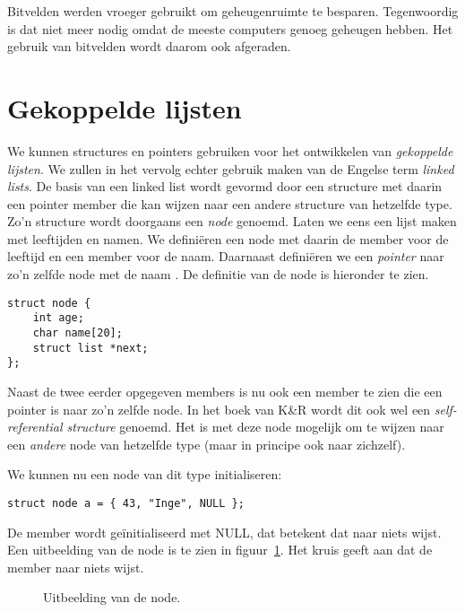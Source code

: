 Bitvelden werden vroeger gebruikt om geheugenruimte te besparen. Tegenwoordig is dat niet meer nodig omdat de meeste computers genoeg geheugen hebben. Het gebruik van bitvelden wordt daarom ook afgeraden.


\section{Gekoppelde lijsten}
We kunnen structures en pointers gebruiken voor het ontwikkelen van \textsl{gekoppelde lijsten}. We zullen in het vervolg echter gebruik maken van de Engelse term \textsl{linked lists}. De basis van een linked list wordt gevormd door een structure met daarin een pointer member die kan wijzen naar een andere structure van hetzelfde type. Zo'n structure wordt doorgaans een \textsl{node} genoemd. Laten we eens een lijst maken met leeftijden en namen. We definiëren een node met daarin de member  voor de leeftijd en een member  voor de naam. Daarnaast definiëren we een \textsl{pointer} naar zo'n zelfde node met de naam . De definitie van de node is hieronder te zien.

\begin{lstlisting}[style=lstoneline]
struct node {
	int age;
	char name[20];
	struct list *next;
};
\end{lstlisting}

Naast de twee eerder opgegeven members is nu ook een member  te zien die een pointer is naar zo'n zelfde node. In het boek van K\&R wordt dit ook wel een \textsl{self-referential structure} genoemd. Het is met deze node mogelijk om te wijzen naar een \textsl{andere} node van hetzelfde type (maar in principe ook naar zichzelf).

We kunnen nu een node van dit type initialiseren:

\begin{lstlisting}[style=lstoneline]
struct node a = { 43, "Inge", NULL };
\end{lstlisting}

De member  wordt geïnitialiseerd met NULL, dat betekent dat  naar niets wijst. Een uitbeelding van de node is te zien in figuur~\ref{fig:strstr1}. Het kruis geeft aan dat de member  naar niets wijst.

\begin{figure}[!ht]
\centering
{}
\caption{Uitbeelding van de node.}
\label{fig:strstr1}
\end{figure}

